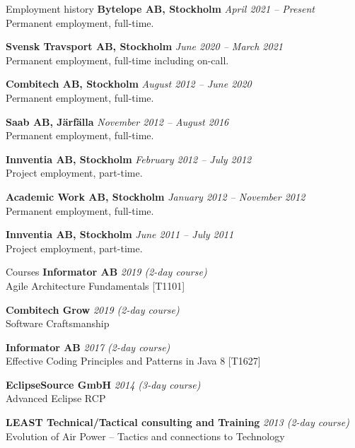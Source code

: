 \documentclass{resume}
\begin{document}
  \pagebreak

  \begin{rSection}{Employment history}
  {\bf Bytelope AB, Stockholm}
    \hfill {\em April 2021 -- Present } \\
    { Permanent employment, full-time. }

    {\bf Svensk Travsport AB, Stockholm}
    \hfill {\em June 2020 -- March 2021 } \\
    { Permanent employment, full-time including on-call. }

    {\bf Combitech AB, Stockholm}
    \hfill {\em August 2012 -- June 2020 } \\
    { Permanent employment, full-time. }

    {\bf Saab AB, Järfälla}
    \hfill {\em November 2012 -- August 2016 } \\
    { Permanent employment, full-time. }

    {\bf Innventia AB, Stockholm}
    \hfill {\em February 2012 -- July 2012 } \\
    { Project employment, part-time. }

    {\bf Academic Work AB, Stockholm}
    \hfill {\em January 2012 -- November 2012 } \\
    { Permanent employment, full-time. }

    {\bf Innventia AB, Stockholm}
    \hfill {\em June 2011 -- July 2011 } \\
    { Project employment, part-time. }

  \end{rSection}

  \begin{rSection}{Courses}
  {\bf Informator AB}
    \hfill {\em 2019 (2-day course) } \\
    { Agile Architecture Fundamentals [T1101] }

    {\bf Combitech Grow}
    \hfill {\em 2019 (2-day course) } \\
    { Software Craftsmanship }

    {\bf Informator AB}
    \hfill {\em 2017 (2-day course) } \\
    { Effective Coding Principles and Patterns in Java 8 [T1627] }

    {\bf EclipseSource GmbH}
    \hfill {\em 2014 (3-day course) } \\
    { Advanced Eclipse RCP }

    {\bf LEAST Technical/Tactical consulting and Training}
    \hfill {\em 2013 (2-day course)} \\
    { Evolution of Air Power – Tactics and connections to Technology }
  \end{rSection}
\end{document}

